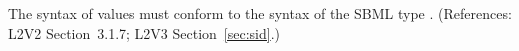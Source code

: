 The syntax of   values must conform to the syntax of the
SBML type .  (References: L2V2 Section~3.1.7;
L2V3 Section~\ref{sec:sid}.)
